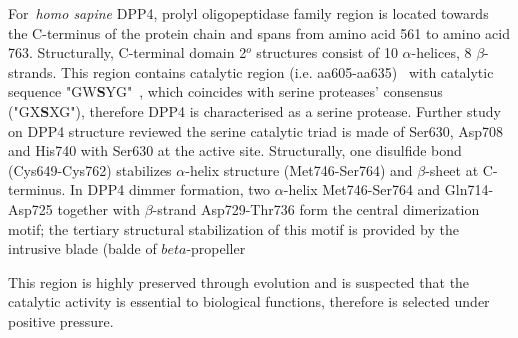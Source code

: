 For~\textit{homo sapine} DPP4, prolyl oligopeptidase family region is located towards the C-terminus of the protein chain and spans from amino acid 561 to amino acid 763. Structurally, C-terminal domain 2$^{o}$ structures consist of 10 $\alpha$-helices, 8 $\beta$-strands. This region contains catalytic region (i.e. aa605-aa635)~\cite{Rawlings1991,Barrett1992,Polgár1992,Rawlings1994} with catalytic sequence "GW\textbf{S}YG"~\cite{Ogata_1992}, which coincides with serine proteases' consensus ("GX\textbf{S}XG"), therefore DPP4 is characterised as a serine protease. Further study on DPP4 structure reviewed the serine catalytic triad is made of Ser630, Asp708 and His740 with Ser630 at the active site. Structurally, one disulfide bond (Cys649-Cys762) stabilizes $\alpha$-helix structure (Met746-Ser764) and $\beta$-sheet at C-terminus. In DPP4 dimmer formation, two $\alpha$-helix Met746-Ser764 and Gln714-Asp725 together with $\beta$-strand Asp729-Thr736 form the central dimerization motif; the tertiary structural stabilization of this motif is provided by the intrusive blade (balde of $beta$-propeller 
\par
This region is highly preserved through evolution and is suspected that the catalytic activity is essential to biological functions, therefore is selected under positive pressure. 
